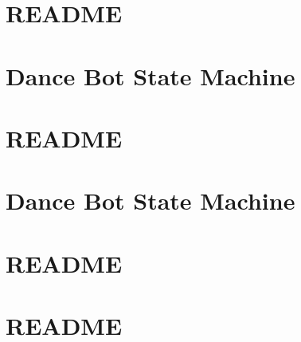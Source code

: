 \documentclass[twoside]{book}
\newcommand{\+}{\discretionary{\mbox{\scriptsize$\hookleftarrow$}}{}{}}
\begin{document}
\chapter{R\+E\+A\+D\+ME}
\label{md_smacc_sm_reference_library_sm_ridgeback_barrel_search_2_README}

\chapter{Dance Bot State Machine}
\label{md_smacc_sm_reference_library_sm_ridgeback_floor_coverage_dynamic_1_launch_readme}

\chapter{R\+E\+A\+D\+ME}
\label{md_smacc_sm_reference_library_sm_ridgeback_floor_coverage_dynamic_1_README}

\chapter{Dance Bot State Machine}
\label{md_smacc_sm_reference_library_sm_ridgeback_floor_coverage_static_1_launch_readme}

\chapter{R\+E\+A\+D\+ME}
\label{md_smacc_sm_reference_library_sm_ridgeback_floor_coverage_static_1_README}

\chapter{R\+E\+A\+D\+ME}
\label{md_smacc_sm_reference_library_sm_starcraft_ai_README}

\end{document}
